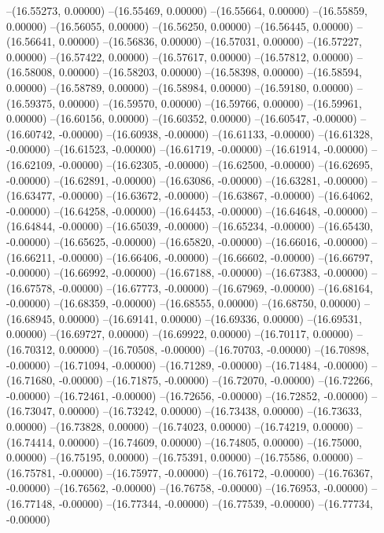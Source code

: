 --(16.55273, 0.00000)
--(16.55469, 0.00000)
--(16.55664, 0.00000)
--(16.55859, 0.00000)
--(16.56055, 0.00000)
--(16.56250, 0.00000)
--(16.56445, 0.00000)
--(16.56641, 0.00000)
--(16.56836, 0.00000)
--(16.57031, 0.00000)
--(16.57227, 0.00000)
--(16.57422, 0.00000)
--(16.57617, 0.00000)
--(16.57812, 0.00000)
--(16.58008, 0.00000)
--(16.58203, 0.00000)
--(16.58398, 0.00000)
--(16.58594, 0.00000)
--(16.58789, 0.00000)
--(16.58984, 0.00000)
--(16.59180, 0.00000)
--(16.59375, 0.00000)
--(16.59570, 0.00000)
--(16.59766, 0.00000)
--(16.59961, 0.00000)
--(16.60156, 0.00000)
--(16.60352, 0.00000)
--(16.60547, -0.00000)
--(16.60742, -0.00000)
--(16.60938, -0.00000)
--(16.61133, -0.00000)
--(16.61328, -0.00000)
--(16.61523, -0.00000)
--(16.61719, -0.00000)
--(16.61914, -0.00000)
--(16.62109, -0.00000)
--(16.62305, -0.00000)
--(16.62500, -0.00000)
--(16.62695, -0.00000)
--(16.62891, -0.00000)
--(16.63086, -0.00000)
--(16.63281, -0.00000)
--(16.63477, -0.00000)
--(16.63672, -0.00000)
--(16.63867, -0.00000)
--(16.64062, -0.00000)
--(16.64258, -0.00000)
--(16.64453, -0.00000)
--(16.64648, -0.00000)
--(16.64844, -0.00000)
--(16.65039, -0.00000)
--(16.65234, -0.00000)
--(16.65430, -0.00000)
--(16.65625, -0.00000)
--(16.65820, -0.00000)
--(16.66016, -0.00000)
--(16.66211, -0.00000)
--(16.66406, -0.00000)
--(16.66602, -0.00000)
--(16.66797, -0.00000)
--(16.66992, -0.00000)
--(16.67188, -0.00000)
--(16.67383, -0.00000)
--(16.67578, -0.00000)
--(16.67773, -0.00000)
--(16.67969, -0.00000)
--(16.68164, -0.00000)
--(16.68359, -0.00000)
--(16.68555, 0.00000)
--(16.68750, 0.00000)
--(16.68945, 0.00000)
--(16.69141, 0.00000)
--(16.69336, 0.00000)
--(16.69531, 0.00000)
--(16.69727, 0.00000)
--(16.69922, 0.00000)
--(16.70117, 0.00000)
--(16.70312, 0.00000)
--(16.70508, -0.00000)
--(16.70703, -0.00000)
--(16.70898, -0.00000)
--(16.71094, -0.00000)
--(16.71289, -0.00000)
--(16.71484, -0.00000)
--(16.71680, -0.00000)
--(16.71875, -0.00000)
--(16.72070, -0.00000)
--(16.72266, -0.00000)
--(16.72461, -0.00000)
--(16.72656, -0.00000)
--(16.72852, -0.00000)
--(16.73047, 0.00000)
--(16.73242, 0.00000)
--(16.73438, 0.00000)
--(16.73633, 0.00000)
--(16.73828, 0.00000)
--(16.74023, 0.00000)
--(16.74219, 0.00000)
--(16.74414, 0.00000)
--(16.74609, 0.00000)
--(16.74805, 0.00000)
--(16.75000, 0.00000)
--(16.75195, 0.00000)
--(16.75391, 0.00000)
--(16.75586, 0.00000)
--(16.75781, -0.00000)
--(16.75977, -0.00000)
--(16.76172, -0.00000)
--(16.76367, -0.00000)
--(16.76562, -0.00000)
--(16.76758, -0.00000)
--(16.76953, -0.00000)
--(16.77148, -0.00000)
--(16.77344, -0.00000)
--(16.77539, -0.00000)
--(16.77734, -0.00000)
